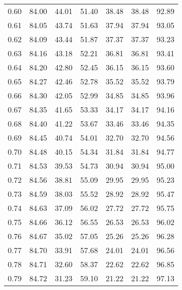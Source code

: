\begin{tabular}{|c|c|c|c|c|c|c|}
      0.60 &     84.00 &     44.01 &      51.40 &   38.48 &      38.48 &         92.89 \\
      0.61 &     84.05 &     43.74 &      51.63 &   37.94 &      37.94 &         93.05 \\
      0.62 &     84.09 &     43.44 &      51.87 &   37.37 &      37.37 &         93.23 \\
      0.63 &     84.16 &     43.18 &      52.21 &   36.81 &      36.81 &         93.41 \\
      0.64 &     84.20 &     42.80 &      52.45 &   36.15 &      36.15 &         93.60 \\
      0.65 &     84.27 &     42.46 &      52.78 &   35.52 &      35.52 &         93.79 \\
      0.66 &     84.30 &     42.05 &      52.99 &   34.85 &      34.85 &         93.96 \\
      0.67 &     84.35 &     41.65 &      53.33 &   34.17 &      34.17 &         94.16 \\
      0.68 &     84.40 &     41.22 &      53.67 &   33.46 &      33.46 &         94.35 \\
      0.69 &     84.45 &     40.74 &      54.01 &   32.70 &      32.70 &         94.56 \\
      0.70 &     84.48 &     40.15 &      54.34 &   31.84 &      31.84 &         94.77 \\
      0.71 &     84.53 &     39.53 &      54.73 &   30.94 &      30.94 &         95.00 \\
      0.72 &     84.56 &     38.81 &      55.09 &   29.95 &      29.95 &         95.23 \\
      0.73 &     84.59 &     38.03 &      55.52 &   28.92 &      28.92 &         95.47 \\
      0.74 &     84.63 &     37.09 &      56.02 &   27.72 &      27.72 &         95.75 \\
      0.75 &     84.66 &     36.12 &      56.55 &   26.53 &      26.53 &         96.02 \\
      0.76 &     84.67 &     35.02 &      57.05 &   25.26 &      25.26 &         96.28 \\
      0.77 &     84.70 &     33.91 &      57.68 &   24.01 &      24.01 &         96.56 \\
      0.78 &     84.71 &     32.60 &      58.37 &   22.62 &      22.62 &         96.85 \\
      0.79 &     84.72 &     31.23 &      59.10 &   21.22 &      21.22 &         97.13 \\

\end{tabular}
